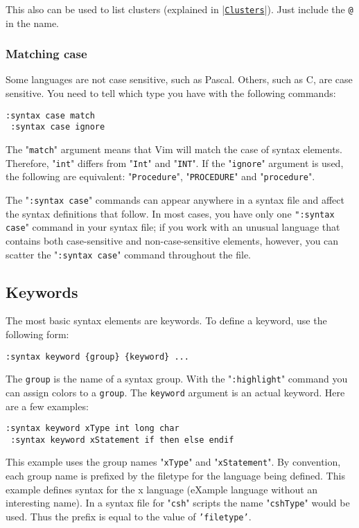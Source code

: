 This also can be used to list clusters (explained in |\hyperref[Clusters]{\texttt{Clusters}}|).
Just include the \texttt{@} in the name.

\subsubsection{Matching case}
Some languages are not case sensitive, such as Pascal.
Others, such as C, are case sensitive.
You need to tell which type you have with the following commands:

\begin{Verbatim}[samepage=true]
 :syntax case match
 :syntax case ignore
\end{Verbatim}

The "\texttt{match}" argument means that Vim will match the case of syntax elements.
Therefore, "\texttt{int}" differs from "\texttt{Int}" and "\texttt{INT}".
If the "\texttt{ignore}" argument is used, the following are equivalent: "\texttt{Procedure}", "\texttt{PROCEDURE}" and "\texttt{procedure}".

The "\texttt{:syntax case}" commands can appear anywhere in a syntax file and affect the syntax definitions that follow.
In most cases, you have only one \texttt{":syntax case}" command in your syntax file; if you work with an unusual language that contains both case-sensitive and non-case-sensitive elements, however, you can scatter the "\texttt{:syntax case}" command throughout the file.
\subsection{Keywords}
The most basic syntax elements are keywords.
To define a keyword, use the following form:

\begin{Verbatim}[samepage=true]
 :syntax keyword {group} {keyword} ...
\end{Verbatim}

The \texttt{{group}} is the name of a syntax group.
With the "\texttt{:highlight}" command you can assign colors to a \texttt{{group}}.
The \texttt{{keyword}} argument is an actual keyword.
Here are a few examples:

\begin{Verbatim}[samepage=true]
 :syntax keyword xType int long char
 :syntax keyword xStatement if then else endif
\end{Verbatim}

This example uses the group names "\texttt{xType}" and "\texttt{xStatement}".
By convention, each group name is prefixed by the filetype for the language being defined.
This example defines syntax for the x language (eXample language without an interesting name).
In a syntax file for "\texttt{csh}" scripts the name "\texttt{cshType}" would be used.
Thus the prefix is equal to the value of \texttt{'filetype'}.

